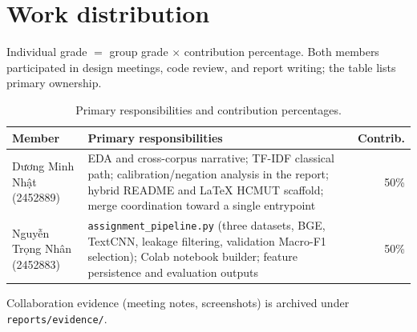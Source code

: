 \section{Work distribution}
\label{sec:work}

Individual grade $=$ group grade $\times$ contribution percentage. Both members participated in design meetings, code review, and report writing; the table lists primary ownership.

\begin{table}[H]
\centering
\caption{Primary responsibilities and contribution percentages.}
\small
\begin{tabular}{@{}p{3.6cm}p{8.2cm}r@{}}
\toprule
Member & Primary responsibilities & Contrib. \\
\midrule
Dương Minh Nhật (2452889) &
EDA and cross-corpus narrative; TF-IDF classical path; calibration/negation analysis in the report; hybrid README and LaTeX HCMUT scaffold; merge coordination toward a single entrypoint &
50\% \\
\midrule
Nguyễn Trọng Nhân (2452883) &
\texttt{assignment\_pipeline.py} (three datasets, BGE, TextCNN, leakage filtering, validation Macro-F1 selection); Colab notebook builder; feature persistence and evaluation outputs &
50\% \\
\bottomrule
\end{tabular}
\end{table}

Collaboration evidence (meeting notes, screenshots) is archived under \texttt{reports/evidence/}.
